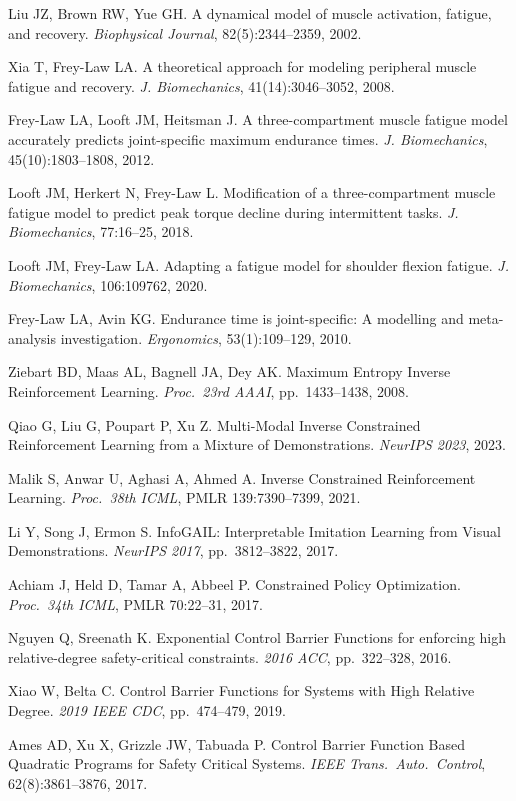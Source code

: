 \documentclass[11pt,a4paper]{article}
\begin{document}
\begin{enumerate}[label={[\arabic*]},leftmargin=*,noitemsep]
\item Liu JZ, Brown RW, Yue GH. A dynamical model of muscle activation, fatigue, and recovery. \emph{Biophysical Journal}, 82(5):2344--2359, 2002.
\item Xia T, Frey-Law LA. A theoretical approach for modeling peripheral muscle fatigue and recovery. \emph{J. Biomechanics}, 41(14):3046--3052, 2008.
\item Frey-Law LA, Looft JM, Heitsman J. A three-compartment muscle fatigue model accurately predicts joint-specific maximum endurance times. \emph{J. Biomechanics}, 45(10):1803--1808, 2012.
\item Looft JM, Herkert N, Frey-Law L. Modification of a three-compartment muscle fatigue model to predict peak torque decline during intermittent tasks. \emph{J. Biomechanics}, 77:16--25, 2018.
\item Looft JM, Frey-Law LA. Adapting a fatigue model for shoulder flexion fatigue. \emph{J. Biomechanics}, 106:109762, 2020.
\item Frey-Law LA, Avin KG. Endurance time is joint-specific: A modelling and meta-analysis investigation. \emph{Ergonomics}, 53(1):109--129, 2010.
\item Ziebart BD, Maas AL, Bagnell JA, Dey AK. Maximum Entropy Inverse Reinforcement Learning. \emph{Proc.\ 23rd AAAI}, pp.~1433--1438, 2008.
\item Qiao G, Liu G, Poupart P, Xu Z. Multi-Modal Inverse Constrained Reinforcement Learning from a Mixture of Demonstrations. \emph{NeurIPS 2023}, 2023.
\item Malik S, Anwar U, Aghasi A, Ahmed A. Inverse Constrained Reinforcement Learning. \emph{Proc.\ 38th ICML}, PMLR 139:7390--7399, 2021.
\item Li Y, Song J, Ermon S. InfoGAIL: Interpretable Imitation Learning from Visual Demonstrations. \emph{NeurIPS 2017}, pp.~3812--3822, 2017.
\item Achiam J, Held D, Tamar A, Abbeel P. Constrained Policy Optimization. \emph{Proc.\ 34th ICML}, PMLR 70:22--31, 2017.
\item Nguyen Q, Sreenath K. Exponential Control Barrier Functions for enforcing high relative-degree safety-critical constraints. \emph{2016 ACC}, pp.~322--328, 2016.
\item Xiao W, Belta C. Control Barrier Functions for Systems with High Relative Degree. \emph{2019 IEEE CDC}, pp.~474--479, 2019.
\item Ames AD, Xu X, Grizzle JW, Tabuada P. Control Barrier Function Based Quadratic Programs for Safety Critical Systems. \emph{IEEE Trans.\ Auto.\ Control}, 62(8):3861--3876, 2017.

\end{enumerate}
\end{document}
